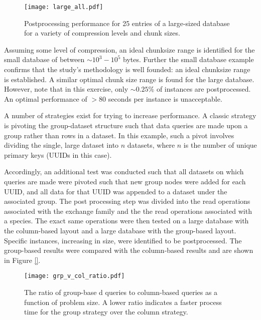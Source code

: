 \begin{figure}
  \begin{center}
    \texttt{[image: large\_all.pdf]}
    \caption[]{
      \label{fig:large_db}
      Postprocessing performance for 25 entries of a large-sized database for a
      variety of compression levels and chunk sizes.}
  \end{center}
\end{figure}

Assuming some level of compression, an ideal chunksize range is identified for
the small database of between $\sim 10^3 - 10^5$ bytes. Further the small
database example confirms that the study's methodology is well founded: an ideal
chunksize range is established. A similar optimal chunk size range is found for
the large database. However, note that in this exercise, only $\sim 0.25\%$ of
instances are postprocessed. An optimal performance of $> 80$ seconds per
instance is unacceptable.

A number of strategies exist for trying to increase performance. A classic
strategy is pivoting the group-dataset structure such that data queries are made
upon a group rather than rows in a dataset. In this example, such a pivot
involves dividing the single, large dataset into $n$ datasets, where $n$ is the
number of unique primary keys (UUIDs in this case). 

Accordingly, an additional test was conducted such that all datasets on which
queries are made were pivoted such that new group nodes were added for each
UUID, and all data for that UUID was appended to a dataset under the associated
group. The post processing step was divided into the read operations associated
with the exchange family and the the read operations associated with a
species. The exact same operations were then tested on a large database with the
column-based layout and a large database with the group-based layout. Specific
instances, increasing in size, were identified to be postprocessed. The
group-based results were compared with the column-based results and are shown in
Figure \ref{}.

\begin{figure}
  \begin{center}
    \texttt{[image: grp\_v\_col\_ratio.pdf]}
    \caption[]{
      \label{fig:col_grp}
      The ratio of group-base d queries to column-based queries as a function of
      problem size. A lower ratio indicates a faster process time for the group
      strategy over the column strategy.}
  \end{center}
\end{figure}

